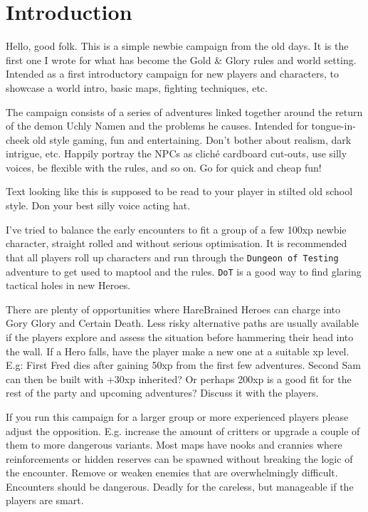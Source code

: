 \section*{Introduction}

Hello, good folk. This is a simple newbie campaign from the old days. It is the first one I wrote for what has become the Gold \& Glory rules and world setting. Intended as a first introductory campaign for new players and characters, to showcase a world intro, basic maps, fighting techniques, etc.

The campaign consists of a series of adventures linked together around the return of the demon Uchly Namen and the problems he causes. Intended for tongue-in-cheek old style gaming, fun and entertaining. Don't bother about realism, dark intrigue, etc. Happily portray the NPCs as cliché cardboard cut-outs, use silly voices, be flexible with the rules, and so on. Go for quick and cheap fun!

\begin{readoutloud}
Text looking like this is supposed to be read to your player in stilted old school style. Don your best silly voice acting hat.
\end{readoutloud}

I've tried to balance the early encounters to fit a group of a few 100xp newbie character, straight rolled and without serious optimisation.
It is recommended that all players roll up characters and run through the \texttt{Dungeon of Testing} adventure to get used to maptool and the rules. \texttt{DoT} is a good way to find glaring tactical holes in new Heroes.

There are plenty of opportunities where HareBrained Heroes can charge into Gory Glory and Certain Death. Less risky alternative paths are usually available if the players explore and assess the situation before hammering their head into the wall. If a Hero falls, have the player make a new one at a suitable xp level. E.g: First Fred dies after gaining 50xp from the first few adventures. Second Sam can then be built with +30xp inherited? Or perhaps 200xp is a good fit for the rest of the party and upcoming adventures? Discuss it with the players.

If you run this campaign for a larger group or more experienced players please adjust the opposition. E.g. increase the amount of critters or upgrade a couple of them to more dangerous variants. Most maps have nooks and crannies where reinforcements or hidden reserves can be spawned without breaking the logic of the encounter. Remove or weaken enemies that are overwhelmingly difficult. Encounters should be dangerous. Deadly for the careless, but manageable if the players are smart.


